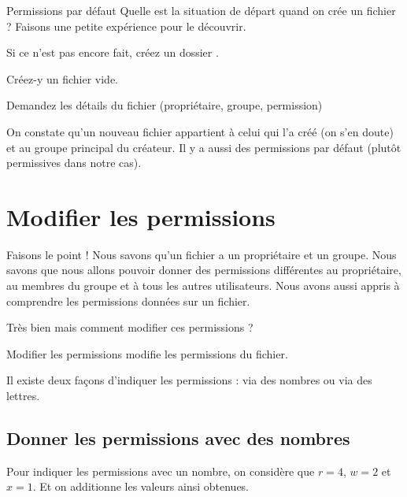\documentclass[a4paper,11pt]{style-esi/td}
\begin{document}
		\begin{Experience}{Permissions par défaut}
			Quelle est la situation de départ quand on crée un fichier ?
			Faisons une petite expérience pour le découvrir.
			\begin{steps}
			\item Si ce n'est pas encore fait, créez un dossier .
			\item Créez-y un fichier vide.
			\item Demandez les détails du fichier (propriétaire, groupe, permission)
			\end{steps}
			On constate qu'un nouveau fichier appartient à celui qui l'a créé 
			(on s'en doute) et au groupe principal du créateur. 
			Il y a aussi des permissions par défaut (plutôt permissives dans notre cas).  
		\end{Experience}		
	
	\section{Modifier les permissions}

		\begin{infotbox}{Faisons le point !}
			Nous savons qu'un fichier a un propriétaire et un groupe.
			Nous savons que nous allons pouvoir donner des permissions
			différentes au propriétaire, au membres du groupe 
			et à tous les autres utilisateurs.
			Nous avons aussi appris à comprendre les permissions données sur un fichier.
		\end{infotbox}
	
		Très bien mais comment modifier ces permissions ?

		\begin{theorie}{Modifier les permissions}
			 modifie les permissions du fichier.
		\end{theorie}

		Il existe deux façons d'indiquer les permissions : via des nombres ou via des lettres.

		\subsection{Donner les permissions avec des nombres}

			Pour indiquer les permissions avec un nombre, 
			on considère que $r=4$, $w=2$ et $x=1$. 
			Et on additionne les valeurs ainsi obtenues.
\end{document}
